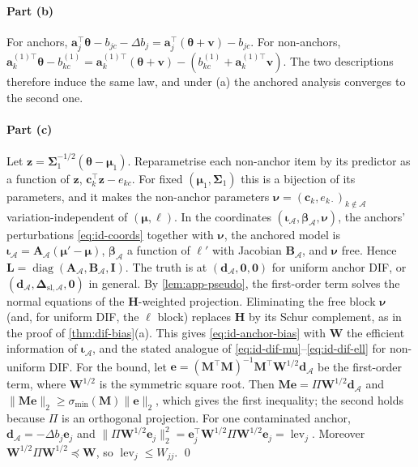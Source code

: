 \paragraph{Part (b)}
For anchors, $\bm a_j^\top\bm\theta-b_{jc}-\Delta b_j=\bm a_j^\top(\bm\theta+\bm v)-b_{jc}$. For non-anchors, $\bm a_k^{(1)\top}\bm\theta-b^{(1)}_{kc}=\bm a_k^{(1)\top}(\bm\theta+\bm v)-(b^{(1)}_{kc}+\bm a_k^{(1)\top}\bm v)$. The two descriptions therefore induce the same law, and under (a) the anchored analysis converges to the second one.

\paragraph{Part (c)}
Let $\bm z=\bm\Sigma_1^{-1/2}(\bm\theta-\bm\mu_1)$. Reparametrise each non-anchor item by its predictor as a function of $\bm z$, $\bm c_k^\top\bm z-e_{kc}$. For fixed $(\bm\mu_1,\bm\Sigma_1)$ this is a bijection of its parameters, and it makes the non-anchor parameters $\bm\nu=(\bm c_k,e_{k\cdot})_{k\notin\mathcal A}$ variation-independent of $(\bm\mu,\bm\ell)$. In the coordinates $(\bm\iota_{\mathcal A},\bm\beta_{\mathcal A},\bm\nu)$, the anchors' perturbations \eqref{eq:id-coords} together with $\bm\nu$, the anchored model is $\bm\iota_{\mathcal A}=\bm A_{\mathcal A}(\bm\mu'-\bm\mu)$, $\bm\beta_{\mathcal A}$ a function of $\bm\ell'$ with Jacobian $\bm B_{\mathcal A}$, and $\bm\nu$ free. Hence $\bm L=\operatorname{diag}(\bm A_{\mathcal A},\bm B_{\mathcal A},\bm I)$. The truth is at $(\bm d_{\mathcal A},\bm0,\bm0)$ for uniform anchor DIF, or $(\bm d_{\mathcal A},\bm\Delta_{\mathrm{sl},\mathcal A},\bm0)$ in general. By \cref{lem:app-pseudo}, the first-order term solves the normal equations of the $\bm H$-weighted projection. Eliminating the free block $\bm\nu$ (and, for uniform DIF, the $\bm\ell$ block) replaces $\bm H$ by its Schur complement, as in the proof of \cref{thm:dif-bias}(a). This gives \eqref{eq:id-anchor-bias} with $\bm W$ the efficient information of $\bm\iota_{\mathcal A}$, and the stated analogue of \eqref{eq:id-dif-mu}--\eqref{eq:id-dif-ell} for non-uniform DIF. For the bound, let $\bm e=(\bm M^\top\bm M)^{-1}\bm M^\top\bm W^{1/2}\bm d_{\mathcal A}$ be the first-order term, where $\bm W^{1/2}$ is the symmetric square root. Then $\bm M\bm e=\Pi\bm W^{1/2}\bm d_{\mathcal A}$ and $\|\bm M\bm e\|_2\ge\sigma_{\min}(\bm M)\|\bm e\|_2$, which gives the first inequality; the second holds because $\Pi$ is an orthogonal projection. For one contaminated anchor, $\bm d_{\mathcal A}=-\Delta b_j\bm e_j$ and $\|\Pi\bm W^{1/2}\bm e_j\|_2^2=\bm e_j^\top\bm W^{1/2}\Pi\bm W^{1/2}\bm e_j=\operatorname{lev}_j$. Moreover $\bm W^{1/2}\Pi\bm W^{1/2}\preceq\bm W$, so $\operatorname{lev}_j\le W_{jj}$. \qed


